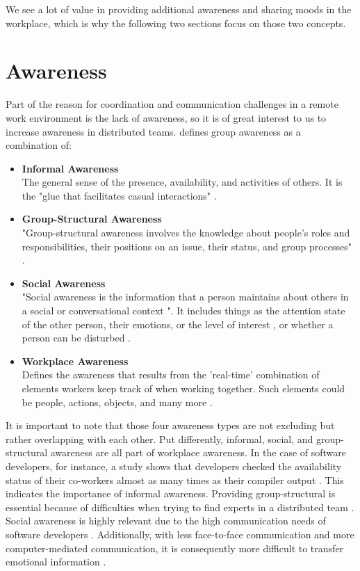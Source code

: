 We see a lot of value in providing additional awareness and sharing moods in the workplace, which is why the following two sections focus on those two concepts.

\section{Awareness}
Part of the reason for coordination and communication challenges in a remote work environment is the lack of awareness, so it is of great interest to us to increase awareness in distributed teams. \textcite{gutwin1996workspace} defines group awareness as a combination of:

\begin{itemize}[itemsep=0ex, parsep=0ex, leftmargin=*]
      \item \textbf{Informal Awareness} \\
            The general sense of the presence, availability, and activities of others. It is the "glue that facilitates casual interactions" \autocite{gutwin1996workspace}.
      \item \textbf{Group-Structural Awareness} \\
            "Group-structural awareness involves the knowledge about people's roles and responsibilities, their positions on an issue, their status, and group processes" \autocite{gutwin1996workspace}.
      \item \textbf{Social Awareness} \\
            "Social awareness is the information that a person maintains about others in a social or conversational context "\autocite{gutwin1996workspace}. It includes things as the attention state of the other person, their emotions, or the level of interest \autocite{gutwin1996workspace}, or whether a person can be disturbed \autocite{gutwin1995support}.
      \item \textbf{Workplace Awareness} \\
            Defines the awareness that results from the 'real-time' combination of elements workers keep track of when working together. Such elements could be people, actions, objects, and many more \autocite{gutwin1995support}.
\end{itemize}

It is important to note that those four awareness types are not excluding but rather overlapping with each other. Put differently, informal, social, and group-structural awareness are all part of workplace awareness. In the case of software developers, for instance, a study shows that developers checked the availability status of their co-workers almost as many times as their compiler output \autocite{ko2007information}. This indicates the importance of informal awareness. Providing group-structural is essential because of difficulties when trying to find experts in a distributed team \autocite{herbsleb2003empirical}. Social awareness is highly relevant due to the high communication needs of software developers \autocite{perry1994people}. Additionally, with less face-to-face communication and more computer-mediated communication, it is consequently more difficult to transfer emotional information \autocite{rivera1996effects}.

